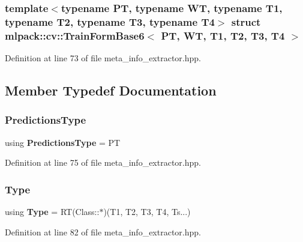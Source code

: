 \subsubsection*{template$<$typename PT, typename WT, typename T1, typename T2, typename T3, typename T4$>$\newline
struct mlpack\+::cv\+::\+Train\+Form\+Base6$<$ P\+T, W\+T, T1, T2, T3, T4 $>$}



Definition at line 73 of file meta\+\_\+info\+\_\+extractor.\+hpp.



\subsection{Member Typedef Documentation}
\mbox{\label{structmlpack_1_1cv_1_1TrainFormBase6_a329a0bee5f08ebbfbd6c97e4f74bdb4f}} 
\subsubsection{Predictions\+Type}
{\footnotesize\ttfamily using \textbf{ Predictions\+Type} =  PT}



Definition at line 75 of file meta\+\_\+info\+\_\+extractor.\+hpp.

\mbox{\label{structmlpack_1_1cv_1_1TrainFormBase6_a31d0847c2645922caef9eaddc3db89d8}} 
\subsubsection{Type}
{\footnotesize\ttfamily using \textbf{ Type} =  RT(Class\+::$\ast$)(T1, T2, T3, T4, Ts...)}



Definition at line 82 of file meta\+\_\+info\+\_\+extractor.\+hpp.

\mbox{\label{structmlpack_1_1cv_1_1TrainFormBase6_aecfc3bfd62796ddd9feb857c898cefa8}} 
